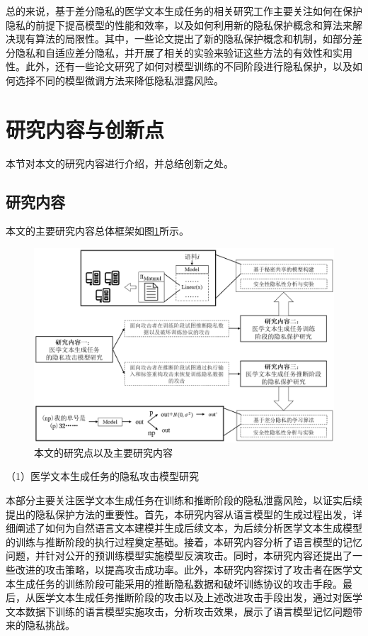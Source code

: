 总的来说，基于差分隐私的医学文本生成任务的相关研究工作主要关注如何在保护隐私的前提下提高模型的性能和效率，以及如何利用新的隐私保护概念和算法来解决现有算法的局限性。其中，一些论文提出了新的隐私保护概念和机制，如部分差分隐私和自适应差分隐私，并开展了相关的实验来验证这些方法的有效性和实用性。此外，还有一些论文研究了如何对模型训练的不同阶段进行隐私保护，以及如何选择不同的模型微调方法来降低隐私泄露风险。

\section{研究内容与创新点}

本节对本文的研究内容进行介绍，并总结创新之处。

\subsection{研究内容}
本文的主要研究内容总体框架如图\ref{Three_Chap_Structure}所示。

\begin{figure}[h]
	\centering
	\includegraphics[width=\linewidth]{figures/Three_Chap_Structure.png}
	\caption{本文的研究点以及主要研究内容}
	\label{Three_Chap_Structure}
\end{figure}

（1）医学文本生成任务的隐私攻击模型研究

本部分主要关注医学文本生成任务在训练和推断阶段的隐私泄露风险，以证实后续提出的隐私保护方法的重要性。首先，本研究内容从语言模型的生成过程出发，详细阐述了如何为自然语言文本建模并生成后续文本，为后续分析医学文本生成模型的训练与推断阶段的执行过程奠定基础。接着，本研究内容分析了语言模型的记忆问题，并针对公开的预训练模型实施模型反演攻击。同时，本研究内容还提出了一些改进的攻击策略，以提高攻击成功率。此外，本研究内容探讨了攻击者在医学文本生成任务的训练阶段可能采用的推断隐私数据和破坏训练协议的攻击手段。最后，从医学文本生成任务推断阶段的攻击以及上述改进攻击手段出发，通过对医学文本数据下训练的语言模型实施攻击，分析攻击效果，展示了语言模型记忆问题带来的隐私挑战。


